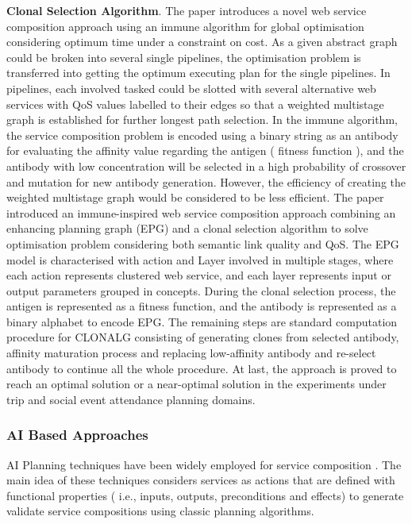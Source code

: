 \textbf{Clonal Selection Algorithm}.
The paper \cite{yan2006immune} introduces a novel web service composition approach using an immune algorithm for global optimisation considering optimum time under a constraint on cost. As a given abstract graph could be broken into several single pipelines, the optimisation problem is transferred into getting the optimum executing plan for the single pipelines. In pipelines, each involved tasked could be slotted with several alternative web services with QoS values labelled to their edges so that a weighted multistage graph is established for further longest path selection. In the immune algorithm, the service composition problem is encoded using a binary string as an antibody for evaluating the affinity value regarding the antigen ( fitness function ), and the antibody with low concentration will be selected in a high probability of crossover and mutation for new antibody generation. However, the efficiency of creating the weighted multistage graph would be considered to be less efficient. The paper \cite{pop2009immune} introduced an immune-inspired web service composition approach combining an enhancing planning graph (EPG) and a clonal selection algorithm to solve optimisation problem considering both semantic link quality and QoS.  The EPG model is characterised with action and Layer involved in multiple stages, where each action represents clustered web service, and each layer represents input or output parameters grouped in concepts.   During the clonal selection process, the antigen is represented as a fitness function, and the antibody is represented as a binary alphabet to encode EPG.  The remaining steps are standard computation procedure for CLONALG consisting of generating clones from selected antibody, affinity maturation process and replacing low-affinity antibody and re-select antibody to continue all the whole procedure. At last, the approach is proved to reach an optimal solution or a near-optimal solution in the experiments under trip and social event attendance planning domains.

\subsubsection{AI Based Approaches}

AI Planning techniques have been widely employed for service composition \cite{markou2015non,peer2005web}. The main idea of these techniques considers services as actions that are defined with functional properties ( i.e., inputs, outputs, preconditions and effects) to generate validate service compositions using classic planning algorithms. 


